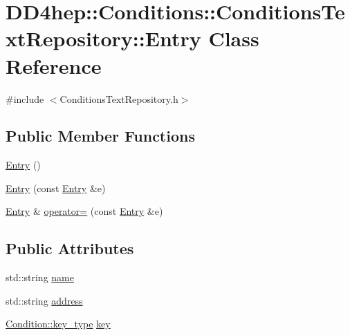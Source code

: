 \hypertarget{class_d_d4hep_1_1_conditions_1_1_conditions_text_repository_1_1_entry}{
\section{DD4hep::Conditions::ConditionsTextRepository::Entry Class Reference}
\label{class_d_d4hep_1_1_conditions_1_1_conditions_text_repository_1_1_entry}
}


{\ttfamily \#include $<$ConditionsTextRepository.h$>$}\subsection*{Public Member Functions}
\begin{DoxyCompactItemize}
\item 
\hyperlink{class_d_d4hep_1_1_conditions_1_1_conditions_text_repository_1_1_entry_a9146bcb872abe9741774c1c6b967fac7}{Entry} ()
\item 
\hyperlink{class_d_d4hep_1_1_conditions_1_1_conditions_text_repository_1_1_entry_afe8a21e97ecbe0686508a5bf5b847f43}{Entry} (const \hyperlink{class_d_d4hep_1_1_conditions_1_1_conditions_text_repository_1_1_entry}{Entry} \&e)
\item 
\hyperlink{class_d_d4hep_1_1_conditions_1_1_conditions_text_repository_1_1_entry}{Entry} \& \hyperlink{class_d_d4hep_1_1_conditions_1_1_conditions_text_repository_1_1_entry_a16b49e4960ded6fa394dc3173f37dd4e}{operator=} (const \hyperlink{class_d_d4hep_1_1_conditions_1_1_conditions_text_repository_1_1_entry}{Entry} \&e)
\end{DoxyCompactItemize}
\subsection*{Public Attributes}
\begin{DoxyCompactItemize}
\item 
std::string \hyperlink{class_d_d4hep_1_1_conditions_1_1_conditions_text_repository_1_1_entry_aacad5506cc8e8f5d9369ff635371a1f6}{name}
\item 
std::string \hyperlink{class_d_d4hep_1_1_conditions_1_1_conditions_text_repository_1_1_entry_a29d5e08d84bea3989d09c5799f3f1393}{address}
\item 
\hyperlink{class_d_d4hep_1_1_conditions_1_1_condition_a7528efa762e8cc072ef80ea67c3531f9}{Condition::key\_\-type} \hyperlink{class_d_d4hep_1_1_conditions_1_1_conditions_text_repository_1_1_entry_a46681700774cfba80ad2c32ea18dd8dd}{key}
\end{DoxyCompactItemize}


